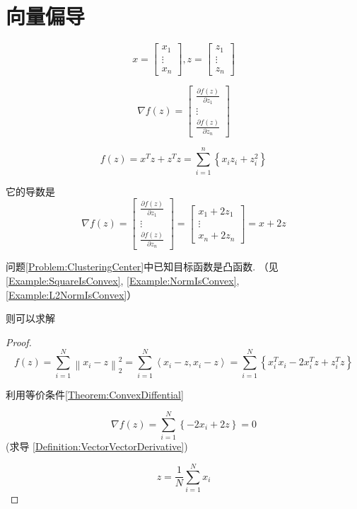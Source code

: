 \section{向量偏导}

\begin{definition}[向量对向量的导数]
    \label{Definition:VectorVectorDerivative}
    $$ x=\left[\begin{array}{c}x_{1} \\ \vdots \\ x_{n}\end{array}\right], z=\left[\begin{array}{c}z_{1} \\ \vdots \\ z_{n}\end{array}\right] $$

    $$ \nabla f(z)=\left[\begin{array}{c}\frac{\partial f(z)}{\partial z_{1}} \\ \vdots \\ \frac{\partial f(z)}{\partial z_{n}}\end{array}\right] $$
\end{definition}

\begin{example}
    $$ f(z)=x^{T} z+z^{T} z=\sum_{i=1}^{n}\left\{x_{i} z_{i}+z_{i}^{2}\right\} $$

    它的导数是
    $$ \nabla f(z)=\left[\begin{array}{c}\frac{\partial f(z)}{\partial z_{1}} \\ \vdots \\ \frac{\partial f(z)}{\partial z_{n}}\end{array}\right]=\left[\begin{array}{c}x_{1}+2 z_{1} \\ \vdots \\ x_{n}+2 z_{n}\end{array}\right]=x+2 z $$
\end{example}


问题\ref{Problem:ClusteringCenter}中已知目标函数是凸函数. （见\ref{Example:SquareIsConvex}, \ref{Example:NormIsConvex}, \ref{Example:L2NormIsConvex}）

则可以求解

\begin{proof}
    

$$ f(z)=\sum_{i=1}^{N}\left\|x_{i}-z\right\|_{2}^{2}=\sum_{i=1}^{N}\left\langle x_{i}-z, x_{i}-z\right\rangle=\sum_{i=1}^{N}\left\{x_{i}^{T} x_{i}-2 x_{i}^{T} z+z_{i}^{T} z\right\} $$

利用等价条件\ref{Theorem:ConvexDiffential}

$$ \nabla f(z)=\sum_{i=1}^{N}\left\{-2 x_{i}+2 z\right\}=0 $$ (求导 \ref{Definition:VectorVectorDerivative})

$$ z=\frac{1}{N} \sum_{i=1}^{N} x_{i} $$
\end{proof}

